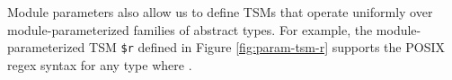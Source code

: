

Module parameters also allow us to define TSMs that operate uniformly over module-parameterized families of abstract types. For example, the module-parameterized TSM \texttt{\$r} defined in Figure \ref{fig:param-tsm-r} supports the POSIX regex syntax for any type  where . 

